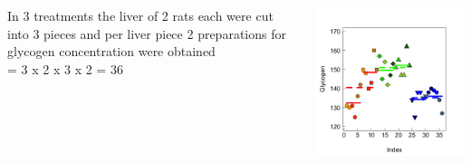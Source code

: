 \documentclass{beamer}
\begin{document}
\begin{frame}[fragile]
    \frametitle{}
    \begin{columns}
        \begin{column}{0.5\textwidth}
            In 3 treatments the liver of 2 rats each were cut into 3 pieces and per liver piece 2 preparations for glycogen concentration were obtained\\
            = 3 x 2 x 3 x 2 = 36
        \end{column}
        \begin{column}{0.5\textwidth}
            \includegraphics[width=\textwidth]{lectures/day_7_diagnostics_of_mems/figures/unnamed-chunk-3-1.png}
        \end{column}
    \end{columns}
\end{frame}
\end{document}
